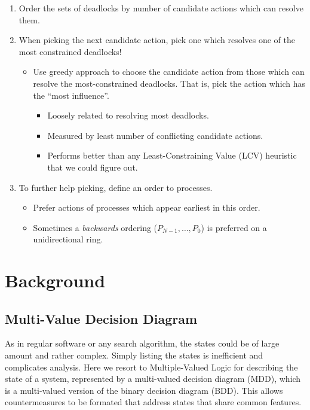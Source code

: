 \begin{enumerate}
\item Order the sets of deadlocks by number of candidate actions which can resolve them.
\item When picking the next candidate action, pick one which resolves one of the most constrained deadlocks!
 \begin{itemize}
 \item Use greedy approach to choose the candidate action from those which can resolve the most-constrained deadlocks. That is, pick the action which has the ``most influence''.
  \begin{itemize}
  \item Loosely related to resolving most deadlocks.
  \item Measured by least number of conflicting candidate actions.
  \item Performs better than any Least-Constraining Value (LCV) heuristic that we could figure out.
  \end{itemize}
 \end{itemize}
\item To further help picking, define an order to processes.
 \begin{itemize}
 \item Prefer actions of processes which appear earliest in this order.
 \item Sometimes a {\it backwards} ordering ($P_{N-1},\dots,P_0$) is preferred on a unidirectional ring.
 \end{itemize}
\end{enumerate}

\section{Background}

\subsection{Multi-Value Decision Diagram}
As in regular software or any search algorithm, the states could be of large amount and rather complex. Simply listing the states is inefficient and complicates analysis. Here we resort to Multiple-Valued Logic for describing the state of a system, represented by a multi-valued decision diagram (MDD), which is a multi-valued version of the binary decision diagram (BDD).
This allows countermeasures to be formated that address states that share common features. 

